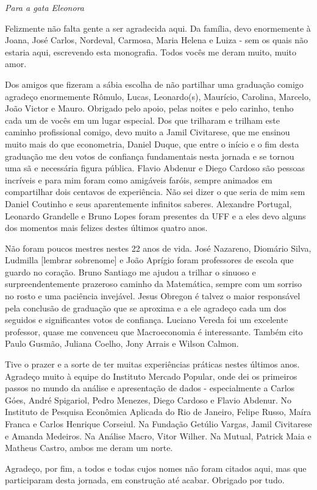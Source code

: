 
\begin{dedicatoria}
	\vspace*{\fill}
	\centering
	\noindent
	\textit{Para a gata Eleonora} \vspace*{\fill}
\end{dedicatoria}

\begin{agradecimentos}

Felizmente não falta gente a ser agradecida aqui. Da família, devo enormemente à Joana, José Carlos, Nordeval, Carmosa, Maria Helena e Luiza - sem os quais não estaria aqui, escrevendo esta monografia. Todos vocês me deram muito, muito amor.

Dos amigos que fizeram a sábia escolha de não partilhar uma graduação comigo agradeço enormemente Rômulo, Lucas, Leonardo(s), Maurício, Carolina, Marcelo, João Victor e Mauro. Obrigado pelo apoio, pelas noites e pelo carinho, tenho cada um de vocês em um lugar especial. Dos que trilharam e trilham este caminho profissional comigo, devo muito a Jamil Civitarese, que me ensinou muito mais do que econometria, Daniel Duque, que entre o início e o fim desta graduação me deu votos de confiança fundamentais nesta jornada e se tornou uma sã e necessária figura pública. Flavio Abdenur e Diego Cardoso são pessoas incríveis e para mim foram como amigáveis faróis, sempre animados em compartilhar dois centavos de experiência. Não sei dizer o que seria de mim sem Daniel Coutinho e seus aparentemente infinitos saberes. Alexandre Portugal, Leonardo Grandelle e Bruno Lopes foram presentes da UFF e a eles devo alguns dos momentos mais felizes destes últimos quatro anos.

Não foram poucos mestres nestes 22 anos de vida. José Nazareno, Diomário Silva, Ludmilla [lembrar sobrenome] e João Aprígio foram professores de escola que guardo no coração. Bruno Santiago me ajudou a trilhar o sinuoso e surpreendentemente prazeroso caminho da Matemática, sempre com um sorriso no rosto e uma paciência invejável. Jesus Obregon é talvez o maior responsável pela conclusão de graduação que se aproxima e a ele agradeço cada um dos seguidos e significantes votos de confiança. Luciano Vereda foi um excelente professor, quase me convenceu que Macroeconomia é interessante. Também cito Paulo Gusmão, Juliana Coelho, Jony Arrais e Wilson Calmon.

Tive o prazer e a sorte de ter muitas experiências práticas nestes últimos anos. Agradeço muito à equipe do Instituto Mercado Popular, onde dei os primeiros passos no mundo da análise e apresentação de dados - especialmente a Carlos Góes, André Spigariol, Pedro Menezes, Diego Cardoso e Flavio Abdenur. No Instituto de Pesquisa Econômica Aplicada do Rio de Janeiro, Felipe Russo, Maíra Franca e Carlos Henrique Corseiul. Na Fundação Getúlio Vargas, Jamil Civitarese e Amanda Medeiros. Na Análise Macro, Vitor Wilher. Na Mutual, Patrick Maia e Matheus Castro, ambos me deram um norte. 

Agradeço, por fim, a todos e todas cujos nomes não foram citados aqui, mas que participaram desta jornada, em construção até acabar. Obrigado por tudo. 


\end{agradecimentos}